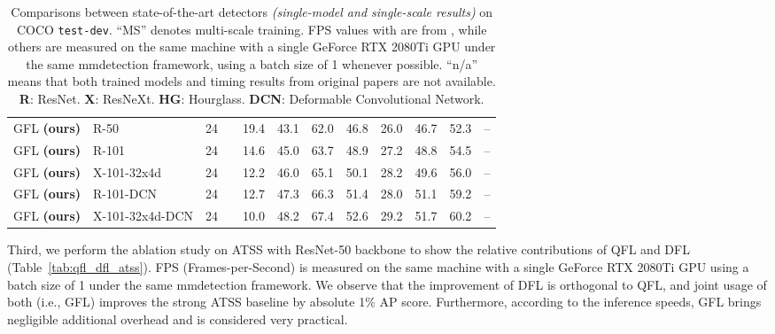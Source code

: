 \documentclass{article}
\begin{document}
\begin{table*}[t]
\begin{threeparttable}
{\begin{tabular}{l|l|c|c|c|ccc|ccc|c}
				\hline
				GFL \textbf{(ours)}&R-50 & 24 &  & 19.4 & 43.1 & 62.0 & 46.8 & 26.0 & 46.7 & 52.3 & -- \\
				GFL \textbf{(ours)}&R-101 & 24 &  & 14.6 & 45.0 & 63.7 & 48.9 & 27.2 & 48.8 & 54.5 & -- \\
				GFL \textbf{(ours)}&X-101-32x4d & 24 &  & 12.2 & 46.0 & 65.1 & 50.1 & 28.2 & 49.6 & 56.0 & -- \\
				GFL \textbf{(ours)}&R-101-DCN & 24 &  & 12.7 & 47.3 & 66.3 & 51.4 & 28.0 & {51.1} & 59.2& -- \\
				GFL \textbf{(ours)}&X-101-32x4d-DCN & 24 &   & 10.0 & {48.2} & {67.4} & {52.6} & {29.2} & {51.7} & {60.2}& -- \\
				\hline
			\end{tabular}
		}
	\end{threeparttable}
	\vspace{-4pt}
	\caption{Comparisons between state-of-the-art detectors \emph{(single-model and single-scale results)} on COCO {\tt test-dev}. ``MS'' denotes multi-scale training. FPS values with  are from \cite{zhu2019soft}, while others are measured on the same machine with a single GeForce RTX 2080Ti GPU under the same mmdetection \cite{chen2019mmdetection} framework, using a batch size of 1 whenever possible. ``n/a'' means that both trained models and timing results from original papers are not available. \textbf{R}: ResNet. \textbf{X}: ResNeXt. \textbf{HG}: Hourglass. \textbf{DCN}: Deformable Convolutional Network.}
	\vspace{-16pt}
	\label{tab_3}
\end{table*}

Third, we perform the ablation study on ATSS with ResNet-50 backbone to show the relative contributions of QFL and DFL (Table~\ref{tab:qfl_dfl_atss}). FPS (Frames-per-Second) is measured on the same machine with a single GeForce RTX 2080Ti GPU using a batch size of 1 under the same mmdetection \cite{chen2019mmdetection} framework. We observe that the improvement of DFL is orthogonal to QFL, and joint usage of both (i.e., GFL) improves the strong ATSS baseline by absolute 1\% AP score. Furthermore, according to the inference speeds, GFL brings negligible additional overhead and is considered very practical.
\end{document}
